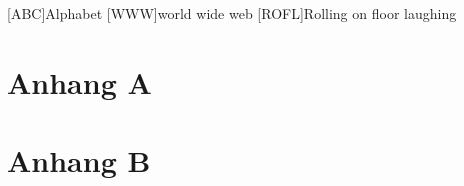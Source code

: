 \documentclass[Master,BMR,german]{BASE/twbook}
\begin{document}
\printbib                                                        %
\clearpage

\listoffigures                                                   %
\clearpage

\listoftables                                                    %
\clearpage

\listoflistings                                                  %
\clearpage

{}
\chapter*{\listacroname}
\begin{acronym}[XXXXX]
    [ABC]{Alphabet}
    [WWW]{world wide web}
    [ROFL]{Rolling on floor laughing}
\end{acronym}
\clearpage
\appendix
\chapter{Anhang A}
\clearpage
\chapter{Anhang B}
\end{document}
